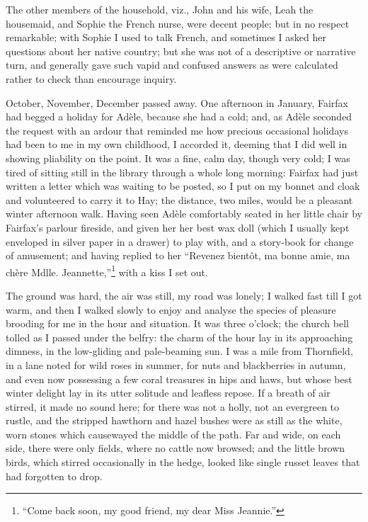 The other members of the household, viz., John and his wife, Leah the
housemaid, and Sophie the French nurse, were decent people; but in no
respect remarkable; with Sophie I used to talk French, and sometimes I
asked her questions about her native country; but she was not of a
descriptive or narrative turn, and generally gave such vapid and
confused answers as were calculated rather to check than encourage
inquiry.

October, November, December passed away. One afternoon in January, \Mrs{}
Fairfax had begged a holiday for Adèle, because she had a cold; and, as
Adèle seconded the request with an ardour that reminded me how precious
occasional holidays had been to me in my own childhood, I accorded it,
deeming that I did well in showing pliability on the point. It was a
fine, calm day, though very cold; I was tired of sitting still in the
library through a whole long morning: \Mrs{} Fairfax had just written a
letter which was waiting to be posted, so I put on my bonnet and cloak
and volunteered to carry it to Hay; the distance, two miles, would be a
pleasant winter afternoon walk. Having seen Adèle comfortably seated in
her little chair by \Mrs{} Fairfax's parlour fireside, and given her her
best wax doll (which I usually kept enveloped in silver paper in a
drawer) to play with, and a story-book for change of amusement; and
having replied to her \foreignquote{french}{Revenez bientôt, ma bonne amie, ma chère
	Mdlle. Jeannette,}\footnote{\enquote{Come back soon, my good friend, my dear Miss Jeannie.}} with a kiss I set out.

The ground was hard, the air was still, my road was lonely; I walked
fast till I got warm, and then I walked slowly to enjoy and analyse the
species of pleasure brooding for me in the hour and situation. It was
three o'clock; the church bell tolled as I passed under the belfry: the
charm of the hour lay in its approaching dimness, in the low-gliding and
pale-beaming sun. I was a mile from Thornfield, in a lane noted for
wild roses in summer, for nuts and blackberries in autumn, and even now
possessing a few coral treasures in hips and haws, but whose best winter
delight lay in its utter solitude and leafless repose. If a breath of
air stirred, it made no sound here; for there was not a holly, not an
evergreen to rustle, and the stripped hawthorn and hazel bushes were as
still as the white, worn stones which causewayed the middle of the
path. Far and wide, on each side, there were only fields, where no
cattle now browsed; and the little brown birds, which stirred
occasionally in the hedge, looked like single russet leaves that had
forgotten to drop.

